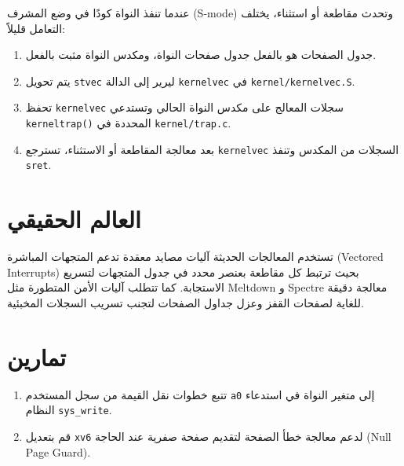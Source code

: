 عندما تنفذ النواة كودًا في وضع المشرف (S-mode) وتحدث مقاطعة أو استثناء، يختلف التعامل قليلاً:
\begin{enumerate}
  \item جدول الصفحات هو بالفعل جدول صفحات النواة، ومكدس النواة مثبت بالفعل.
  \item يتم تحويل \texttt{stvec} ليرير إلى الدالة \texttt{kernelvec} في \texttt{kernel/kernelvec.S}.
  \item تحفظ \texttt{kernelvec} سجلات المعالج على مكدس النواة الحالي وتستدعي \texttt{kerneltrap()} المحددة في \texttt{kernel/trap.c}.
  \item بعد معالجة المقاطعة أو الاستثناء، تسترجع \texttt{kernelvec} السجلات من المكدس وتنفذ \texttt{sret}.
\end{enumerate}

\section{العالم الحقيقي}
\label{sec:real_world_trap}

تستخدم المعالجات الحديثة آليات مصايد معقدة تدعم المتجهات المباشرة (Vectored Interrupts) بحيث ترتبط كل مقاطعة بعنصر محدد في جدول المتجهات لتسريع الاستجابة. كما تتطلب آليات الأمن المتطورة مثل Meltdown و Spectre معالجة دقيقة للغاية لصفحات القفز وعزل جداول الصفحات لتجنب تسريب السجلات المخبئية.

\section{تمارين}
\label{sec:exercises_trap}

\begin{enumerate}
  \item تتبع خطوات نقل القيمة من سجل المستخدم \texttt{a0} إلى متغير النواة في استدعاء النظام \texttt{sys\_write}.
  \item قم بتعديل \texttt{xv6} لدعم معالجة خطأ الصفحة لتقديم صفحة صفرية عند الحاجة (Null Page Guard).
\end{enumerate}
